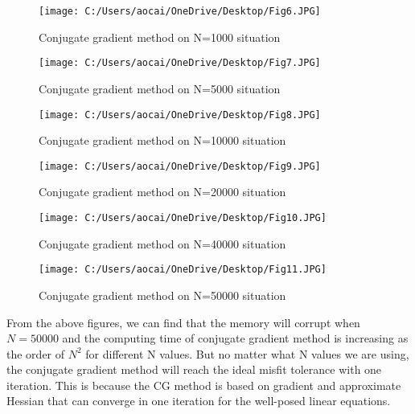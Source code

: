 \documentclass[12pt]{article}
\begin{document}
\begin{figure}[H]
	\centering
	\texttt{[image: C:/Users/aocai/OneDrive/Desktop/Fig6.JPG]}
	\caption[Optional caption]{Conjugate gradient method on N=1000 situation}
	\label{fig:8}
\end{figure}

\begin{figure}[H]
	\centering
	\texttt{[image: C:/Users/aocai/OneDrive/Desktop/Fig7.JPG]}
	\caption[Optional caption]{Conjugate gradient method on N=5000 situation}
	\label{fig:9}
\end{figure}

\begin{figure}[H]
	\centering
	\texttt{[image: C:/Users/aocai/OneDrive/Desktop/Fig8.JPG]}
	\caption[Optional caption]{Conjugate gradient method on N=10000 situation}
	\label{fig:10}
\end{figure}

\begin{figure}[H]
	\centering
	\texttt{[image: C:/Users/aocai/OneDrive/Desktop/Fig9.JPG]}
	\caption[Optional caption]{Conjugate gradient method on N=20000 situation}
	\label{fig:11}
\end{figure}

\begin{figure}[H]
	\centering
	\texttt{[image: C:/Users/aocai/OneDrive/Desktop/Fig10.JPG]}
	\caption[Optional caption]{Conjugate gradient method on N=40000 situation}
	\label{fig:12}
\end{figure}

\begin{figure}[H]
	\centering
	\texttt{[image: C:/Users/aocai/OneDrive/Desktop/Fig11.JPG]}
	\caption[Optional caption]{Conjugate gradient method on N=50000 situation}
	\label{fig:13}
\end{figure}
From the above figures, we can find that the memory will corrupt when $N=50000$ and the computing time of conjugate gradient method is increasing as the order of $N^2$ for different N values. But no matter what N values we are using, the conjugate gradient method will reach the ideal misfit tolerance with one iteration. This is because the CG method is based on gradient and approximate Hessian that can converge in one iteration for the well-posed linear equations.
\end{document}
